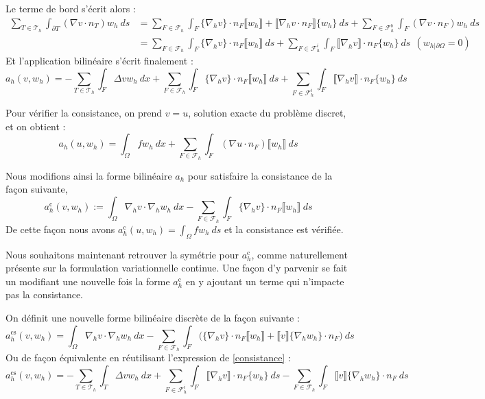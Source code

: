 Le terme de bord s'écrit alors :
\begin{equation*}
\begin{split}
    \sum_{T \in \mathcal{T}_h} \int_{\partial T} (\nabla v \cdot n_T)w_h \ ds &= \sum_{F \in \mathcal{F}_h} \int_F \{ \nabla_hv \} \cdot n_F \llbracket w_h \rrbracket + \llbracket \nabla_h v \cdot n_F \rrbracket \{w_h\} \ ds + \sum_{F \in \mathcal{F}_h^b}\int_F (\nabla v \cdot n_F)w_h \ ds \\
    &= \sum_{F \in \mathcal{F}_h} \int_F \{ \nabla_hv \} \cdot n_F \llbracket w_h \rrbracket \ ds + \sum_{F \in \mathcal{F}_h^i} \int_F \llbracket \nabla_h v \rrbracket \cdot n_F \{w_h\} \ ds \ \ (w_{h|\partial \Omega} = 0)
\end{split}
\end{equation*}
Et l'application bilinéaire s'écrit finalement :
\begin{equation}
    a_h(v,w_h) = -\sum_{T \in \mathcal{T}_h} \int_F \Delta v w_h \ dx +  \sum_{F \in \mathcal{F}_h} \int_F \{ \nabla_hv \} \cdot n_F \llbracket w_h \rrbracket \ ds + \sum_{F \in \mathcal{F}_h^i} \int_F \llbracket \nabla_h v \rrbracket \cdot n_F \{w_h\} \ ds \label{consistance}
\end{equation}

Pour vérifier la consistance, on prend $v = u$, solution exacte du problème discret, et on obtient :
$$a_h(u,w_h) = \int_{\Omega}fw_h \ dx + \sum_{F \in \mathcal{F}_h} \int_F (\nabla u \cdot n_F) \llbracket w_h \rrbracket \ ds $$

Nous modifions ainsi la forme bilinéaire $a_h$ pour satisfaire la consistance de la façon suivante,
$$a_h^{\text{c}}(v,w_h) := \int_{\Omega} \nabla_h v \cdot \nabla_h w_h \ dx - \sum_{F \in \mathcal{F}_h} \int_F \{ \nabla_h v \} \cdot n_F \llbracket w_h \rrbracket \ ds $$
De cette façon nous avons $a_h^{\text{c}}(u,w_h) = \int_{\Omega} fw_h \ ds$ et la consistance est vérifiée.

Nous souhaitons maintenant retrouver la symétrie pour $a_h^{\text{c}}$, comme naturellement présente sur la formulation variationnelle continue. 
Une façon d'y parvenir se fait un modifiant une nouvelle fois la forme $a_h^{\text{c}}$ en y ajoutant un terme qui n'impacte pas la consistance.

On définit une nouvelle forme bilinéaire discrète de la façon suivante :
\begin{equation}
    a_h^{\text{cs}}(v,w_h) = \int_{\Omega} \nabla_h v \cdot \nabla_h w_h \ dx - \sum_{F \in \mathcal{F}_h} \int_F \Big( \{ \nabla_h v \} \cdot n_F \llbracket w_h \rrbracket + \llbracket v \rrbracket \{ \nabla_h w_h \} \cdot n_F \Big) \ ds \label{symétrie}
\end{equation}
Ou de façon équivalente en réutilisant l'expression de \ref{consistance} :
$$a_h^{\text{cs}}(v,w_h) = -\sum_{T \in \mathcal{T}_h}\int_T \Delta v w_h \ dx + \sum_{F \in \mathcal{F}_h^i} \int_{F} \llbracket \nabla_h v \rrbracket \cdot n_F \{w_h\} \ ds - \sum_{F \in \mathcal{F}_h} \int_F \llbracket v \rrbracket \{ \nabla_h w_h \} \cdot n_F \ ds $$

